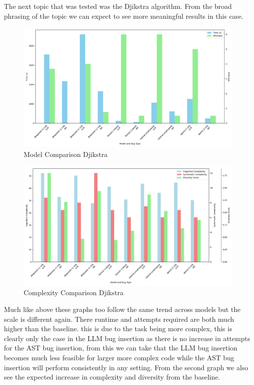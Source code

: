 \documentclass[12pt]{extarticle}
\begin{document}
The next topic that was tested was the Djikstra algorithm. From the broad phrasing of the topic we can expect to see more meaningful results in this case.

\begin{figure}[H]
\centering
\includegraphics[width=0.7\linewidth]{Images/Model_Comparison_Djikstra.png}
\caption{Model Comparison Djikstra}
\label{fig:Model_Comparison_Djikstra}
\end{figure}

\begin{figure}[H]
\centering
\includegraphics[width=0.8\linewidth]{Images/Complexity_Comparison_Djikstra.png}
\caption{Complexity Comparison Djikstra}
\label{fig:Complexity_Comparison_Djikstra}
\end{figure}

Much like above these graphs too follow the same trend across models but the scale is different again. There runtime and attempts required are both much higher than the baseline. this is due to the task being more complex, this is clearly only the case in the LLM bug insertion as there is no increase in attempts for the AST bug insertion, from this we can take that the LLM bug insertion becomes much less feasible for larger more complex code while the AST bug insertion will perform consistently in any setting. From the second graph we also see the expected increase in complexity and diversity from the baseline.
\end{document}
